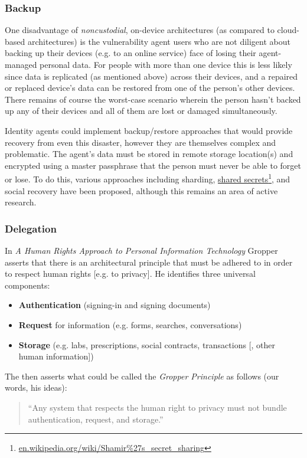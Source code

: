 \documentclass[11pt, oneside]{article}   	%
\newcommand{\hyperfootnote}[1][]{\def\ArgI{{#1}}\hyperfootnoteRelay}
\newcommand\hyperfootnoteRelay[2][]{\href{#1#2}{\ArgI}\footnote{\href{#1#2}{#2}}}
\begin{document}
\subsubsection{Backup} 

One disadvantage of \emph{noncustodial}, on-device architectures (as compared to cloud-based architectures) is the vulnerability agent users who are not diligent about backing up their devices (e.g. to an online service) face of losing their agent-managed personal data. For people with more than one device this is less likely since data is replicated (as mentioned above) across their devices, and a repaired or replaced device's data can be restored from one of the person's other devices. There remains of course the worst-case scenario wherein the person hasn't backed up any of their devices and all of them are lost or damaged simultaneously. 

Identity agents could implement backup/restore approaches that would provide recovery from even this disaster, however they are themselves complex and problematic. The agent's data must be stored in remote storage location(s) and encrypted using a master passphrase that the person must never be able to forget or lose. To do this, various approaches including sharding, \hyperfootnote[shared secrets][https://]{en.wikipedia.org/wiki/Shamir\%27s\_secret\_sharing}, and social recovery have been proposed, although this remains an area of active research. 

\subsubsection{Delegation}

In \emph{A Human Rights Approach to Personal Information Technology}\cite{Gropper2022} Gropper asserts that there is an architectural principle that must be adhered to in order to respect human rights [e.g. to privacy]. He identifies three universal components:

\begin{itemize}
\item \textbf{Authentication} (signing-in and signing documents)
\item \textbf{Request} for information (e.g. forms, searches, conversations)
\item \textbf{Storage} (e.g. labs, prescriptions, social contracts, transactions [, other human information])
\end{itemize}

The then asserts what could be called the \emph{Gropper Principle} as follows (our words, his ideas):
\begin{quote}
``Any system that respects the human right to privacy must not bundle authentication, request, and storage.''
\end{quote}
\end{document}
